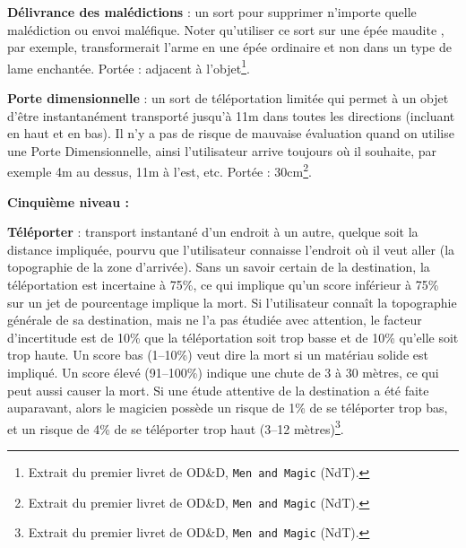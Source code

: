 \documentclass[11pt]{article}
\newcommand{\ODDtitlefont}{\fontsize{60}{40}\fontspec{Saloon Girl Inline}\selectfont}
\begin{document}
{\bigskip

\label{sort-delivrance-malediction}\textbf{Délivrance des malédictions} : un sort pour supprimer n'importe quelle malédiction ou envoi maléfique. Noter qu'utiliser ce sort sur une \og épée maudite \fg{}, par exemple, transformerait l'arme en une épée ordinaire et non dans un type de lame enchantée. Portée : adjacent à l'objet\footnote{Extrait du premier livret de OD\&D, \texttt{Men and Magic} (NdT).}.

\bigskip

\label{sort-porte-dimensionnelle}\textbf{Porte dimensionnelle} : un sort de téléportation limitée qui permet à un objet d'être instantanément transporté jusqu'à 11m dans toutes les directions (incluant en haut et en bas). Il n'y a pas de risque de mauvaise évaluation quand on utilise une Porte Dimensionnelle, ainsi l'utilisateur arrive toujours où il souhaite, par exemple 4m au dessus, 11m à l'est, etc. Portée : 30cm\footnote{Extrait du premier livret de OD\&D, \texttt{Men and Magic} (NdT).}.

\bigskip

\textbf{Cinquième niveau :}

\bigskip

\label{sort-teleporter}\textbf{Téléporter} : transport instantané d'un endroit à un autre, quelque soit la distance impliquée, pourvu que l'utilisateur connaisse l'endroit où il veut aller (la topographie de la zone d'arrivée). Sans un savoir certain de la destination, la téléportation est incertaine à 75\%, ce qui implique qu'un score inférieur à 75\% sur un jet de pourcentage implique la mort. Si l'utilisateur connaît la topographie générale de sa destination, mais ne l'a pas étudiée avec attention, le facteur d'incertitude est de 10\% que la téléportation soit trop basse et de 10\% qu'elle soit trop haute. Un score bas (1--10\%) veut dire la mort si un matériau solide est impliqué. Un score élevé (91--100\%) indique une chute de 3 à 30 mètres, ce qui peut aussi causer la mort. Si une étude attentive de la destination a été faite auparavant, alors le magicien possède un risque de 1\% de se téléporter trop bas, et un risque de 4\% de se téléporter trop haut (3--12 mètres)\footnote{Extrait du premier livret de OD\&D, \texttt{Men and Magic} (NdT).}.

\bigskip

\newpage
{}\begin{center}
{\Huge \ODDtitlefont{DONJONS \& DRAGONS}}{\normalsize \textsuperscript{\sffamily\textregistered}}


\end{center}}
\end{document}
